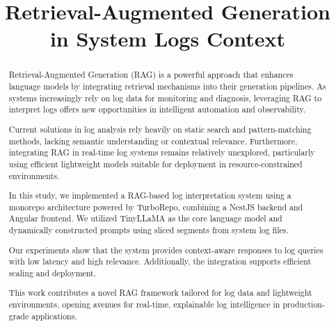 \documentclass[conference]{IEEEtran}
\begin{document}
\title{Retrieval-Augmented Generation in System Logs Context \\
}

\author{
\and
{}
}

\maketitle

\begin{abstract}
Retrieval-Augmented Generation (RAG) is a powerful approach that enhances language models by integrating retrieval mechanisms into their generation pipelines. As systems increasingly rely on log data for monitoring and diagnosis, leveraging RAG to interpret logs offers new opportunities in intelligent automation and observability.

Current solutions in log analysis rely heavily on static search and pattern-matching methods, lacking semantic understanding or contextual relevance. Furthermore, integrating RAG in real-time log systems remains relatively unexplored, particularly using efficient lightweight models suitable for deployment in resource-constrained environments.

In this study, we implemented a RAG-based log interpretation system using a monorepo architecture powered by TurboRepo, combining a NestJS backend and Angular frontend. We utilized TinyLLaMA as the core language model and dynamically constructed prompts using sliced segments from system log files.

Our experiments show that the system provides context-aware responses to log queries with low latency and high relevance. Additionally, the integration supports efficient scaling and deployment.

This work contributes a novel RAG framework tailored for log data and lightweight environments, opening avenues for real-time, explainable log intelligence in production-grade applications.
\end{abstract}
\end{document}
